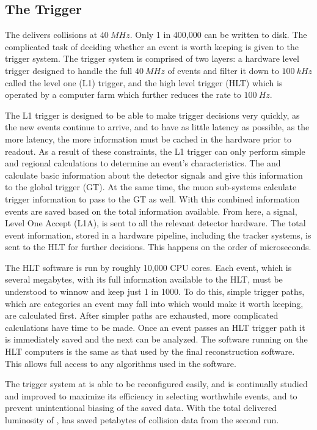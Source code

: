 \subsection{The Trigger}

The \LHC delivers collisions at \ensuremath{\SI{40}{MHz}}. Only 1 in 400,000 can be written to disk. The complicated task of deciding whether an event is worth keeping is given to the trigger system. The \CMS trigger system is comprised of two layers: a hardware level trigger designed to handle the full \ensuremath{\SI{40}{MHz}} of events and filter it down to \ensuremath{\SI{100}{kHz}} called the level one (L1) trigger, and the high level trigger (HLT) which is operated by a computer farm which further reduces the rate to \ensuremath{\SI{100}{Hz}}.

The L1 trigger is designed to be able to make trigger decisions very quickly, as the new events continue to arrive, and to have as little latency as possible, as the more latency, the more information must be cached in the hardware prior to readout.  As a result of these constraints, the L1 trigger can only perform simple and regional calculations to determine an event's characteristics.  The \ECAL and \HCAL calculate basic information about the detector signals and give this information to the global trigger (GT).  At the same time, the muon sub-systems calculate trigger information to pass to the GT as well. With this combined information events are saved based on the total information available.  From here, a signal, Level One Accept (L1A), is sent to all the relevant detector hardware. The total event information, stored in a hardware pipeline, including the tracker systems, is sent to the HLT for further decisions. This happens on the order of microseconds.

The HLT software is run by roughly 10,000 CPU cores.  Each event, which is several megabytes, with its full information available to the HLT, must be understood to winnow and keep just 1 in 1000.  To do this, simple trigger paths, which are categories an event may fall into which would make it worth keeping, are calculated first.  After simpler paths are exhausted, more complicated calculations have time to be made.  Once an event passes an HLT trigger path it is immediately saved and the next can be analyzed.  The software running on the HLT computers is the same as that used by the final reconstruction software.  This allows full access to any algorithms used in the software.

The trigger system at \CMS is able to be reconfigured easily, and is continually studied and improved to maximize its efficiency in selecting worthwhile events, and to prevent unintentional biasing of the saved data.
With the total delivered luminosity of \GLNTOTALII , \CMS has saved petabytes of collision data from the second run.

